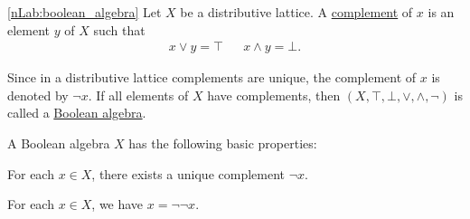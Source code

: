 \begin{definition}\label{def:boolean_algebra}\cref{nLab:boolean_algebra}
  Let $X$ be a distributive lattice. A \uline{complement} of $x$ is an element $y$ of $X$ such that
  \begin{align*}
    x \lor y = \top && x \land y = \bot.
  \end{align*}

  Since in a distributive lattice complements are unique, the complement of $x$ is denoted by $\neg x$. If all elements of $X$ have complements, then $(X, \top, \bot, \lor, \land, \neg)$ is called a \uline{Boolean algebra}.
\end{definition}

\begin{proposition}\label{thm:boolean_algebra_properties}
  A Boolean algebra $X$ has the following basic properties:
  \begin{defenum}
    \item\label{thm:boolean_algebra_properties/unique_complement} For each $x \in X$, there exists a unique complement $\neg x$.
    \item\label{thm:boolean_algebra_properties/double_complement} For each $x \in X$, we have $x = \neg \neg x$.
  \end{defenum}
\end{proposition}
